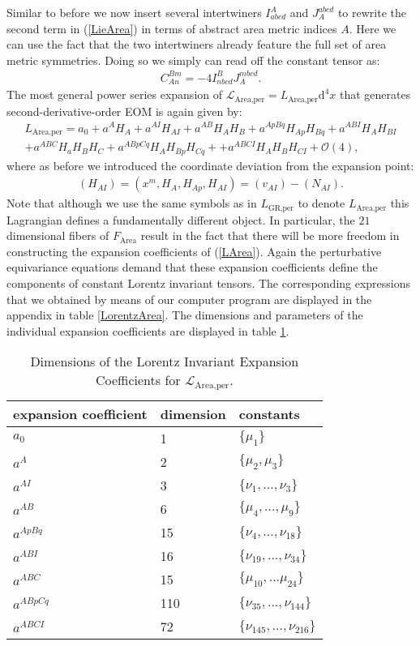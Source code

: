 Similar to before we now insert several intertwiners $I^A_{abcd}$ and $J_A^{abcd}$ to rewrite the second term in (\ref{LieArea}) in terms of abstract area metric indices $A$. Here we can use the fact that the two intertwiners already feature the full set of area metric symmetries.  Doing so we simply can read off the constant tensor as:
\begin{align}\label{areaGotayMInter}
    C_{An}^{Bm} = -4 I^B_{nbcd} J_A^{mbcd}.
\end{align}
The most general power series expansion of $\mathcal{L}_{\text{Area,per}} = L_{\text{Area,per}}\mathrm{d}^4x$ that generates second-derivative-order EOM is again given by:
\begin{align}\label{LArea}
    L_{\text{Area,per}} =  a_0 + a^A H_A + a^{AI}H_{AI} + a^{AB} H_{A}H_{B} + a^{ApBq} H_{Ap}H_{Bq} + a^{ABI} H_{A} H_{BI} \\
    + a^{ABC} H_a H_B H_C + a^{ABpCq} H_{A}H_{Bp}H_{Cq} +
    + a^{ABCI} H_A H_B H_{CI} 
    + \mathcal{O}(4),
\end{align}
where as before we introduced the coordinate deviation from the expansion point: 
\begin{align}
(H_{AI}) = (x^m,H_A,H_{Ap},H_{AI}) = (v_{AI}) - (N_{AI}).
\end{align}
Note that although we use the same symbols as in $L_{\text{GR,per}}$ to denote $L_{\text{Area,per}}$ this Lagrangian defines a fundamentally different object. In particular, the $21$ dimensional fibers of  $F_{\text{Area}}$ result in the fact that there will be more freedom in constructing the expansion coefficients of (\ref{LArea}). Again the perturbative equivariance equations demand that these expansion coefficients define the components of constant Lorentz invariant tensors. The corresponding expressions that we obtained by means of our computer program are displayed in the appendix in table \ref{LorentzArea}. The dimensions and parameters of the individual expansion coefficients are displayed in table \ref{AreaExp}.
\begin{table}
\centering 
\begin{tabular}{lll} \toprule
    expansion coefficient & dimension & constants   \\ \midrule
    $a_0$ & 1 & $\{\mu_1\}$ \\
    $a^A$ & 2 & $\{\mu_2,\mu_3\}$ \\
    $a^{AI}$ & 3 & $\{\nu_1,..., \nu_3\}$ \\
    $a^{AB}$ & 6 & $\{\mu_4,..., \mu_9 \} $ \\
    $a^{ApBq}$ & 15 & $\{\nu_4,...,\nu_{18}\}$ \\
    $a^{ABI}$ & 16 & $\{ \nu_{19},...,\nu_{34} \}$ \\
    $a^{ABC}$ & 15 & $\{ \mu_{10},...\mu_{24} \}$\\
    $a^{ABpCq}$ & 110 & $\{\nu_{35},...,\nu_{144} \}$ \\
    $a^{ABCI}$ & 72 & $\{ \nu_{145},...,\nu_{216}\}$ \\ \bottomrule
\end{tabular}
\caption{Dimensions of the Lorentz Invariant Expansion Coefficients for $\mathcal{L}_{\text{Area,per}}$.}\label{AreaExp}
\end{table}
